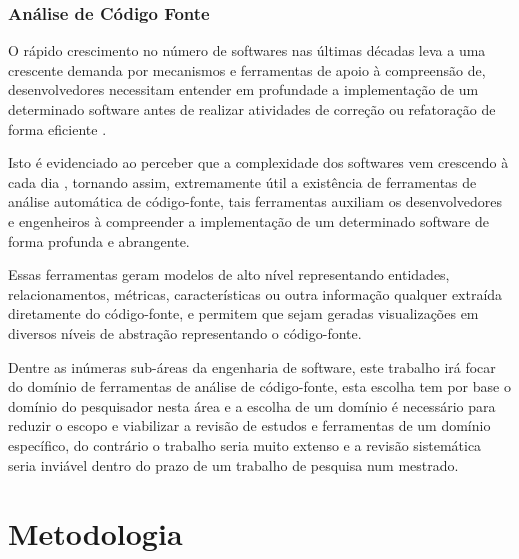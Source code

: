 \documentclass[12pt]{article}
\begin{document}
\subsubsection{Análise de Código Fonte}

O rápido crescimento no número de softwares nas últimas décadas leva a uma
crescente demanda por mecanismos e ferramentas de apoio à compreensão de,
desenvolvedores necessitam entender em profundade a implementação de um
determinado software antes de realizar atividades de correção ou refatoração
de forma eficiente \cite{Kirkov2010}.

Isto é evidenciado ao perceber que a complexidade dos softwares vem crescendo
à cada dia \cite{Kirkov2010}, tornando assim, extremamente útil a existência
de ferramentas de análise automática de código-fonte, tais ferramentas
auxiliam os desenvolvedores e engenheiros à compreender a implementação de um
determinado software de forma profunda e abrangente.

Essas ferramentas geram modelos de alto nível representando entidades,
relacionamentos, métricas, características ou outra informação qualquer
extraída diretamente do código-fonte, e permitem que sejam geradas
visualizações em diversos níveis de abstração representando o código-fonte.

Dentre as inúmeras sub-áreas da engenharia de software, este trabalho irá
focar do domínio de ferramentas de análise de código-fonte, esta escolha tem
por base o domínio do pesquisador nesta área e a escolha de um domínio é
necessário para reduzir o escopo e viabilizar a revisão de estudos e
ferramentas de um domínio específico, do contrário o trabalho seria muito
extenso e a revisão sistemática seria inviável dentro do prazo de um trabalho
de pesquisa num mestrado.

\section{Metodologia}
\end{document}
